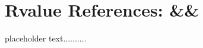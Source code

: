 \newpage
\section[{\itshape rvalue} References]{Rvalue References: {\SecCode \&\&}}\label{Rvalue-References}


placeholder text..........


